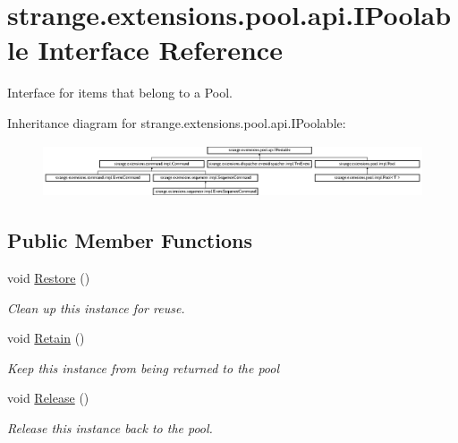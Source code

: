 \hypertarget{interfacestrange_1_1extensions_1_1pool_1_1api_1_1_i_poolable}{\section{strange.\-extensions.\-pool.\-api.\-I\-Poolable Interface Reference}
\label{interfacestrange_1_1extensions_1_1pool_1_1api_1_1_i_poolable}
}


Interface for items that belong to a Pool.  


Inheritance diagram for strange.\-extensions.\-pool.\-api.\-I\-Poolable\-:\begin{figure}[H]
\begin{center}
\leavevmode
\includegraphics[height=1.551247cm]{interfacestrange_1_1extensions_1_1pool_1_1api_1_1_i_poolable}
\end{center}
\end{figure}
\subsection*{Public Member Functions}
\begin{DoxyCompactItemize}
\item 
void \hyperlink{interfacestrange_1_1extensions_1_1pool_1_1api_1_1_i_poolable_a3eb6437f37f1e87b92c55a32689a0ef5}{Restore} ()
\begin{DoxyCompactList}\small\item\em Clean up this instance for reuse. \end{DoxyCompactList}\item 
void \hyperlink{interfacestrange_1_1extensions_1_1pool_1_1api_1_1_i_poolable_ad51f2499e20163c58147a886e5fd5692}{Retain} ()
\begin{DoxyCompactList}\small\item\em Keep this instance from being returned to the pool \end{DoxyCompactList}\item 
void \hyperlink{interfacestrange_1_1extensions_1_1pool_1_1api_1_1_i_poolable_afdea864987f51cfc9d83e9158dfcaa33}{Release} ()
\begin{DoxyCompactList}\small\item\em Release this instance back to the pool. \end{DoxyCompactList}\end{DoxyCompactItemize}
